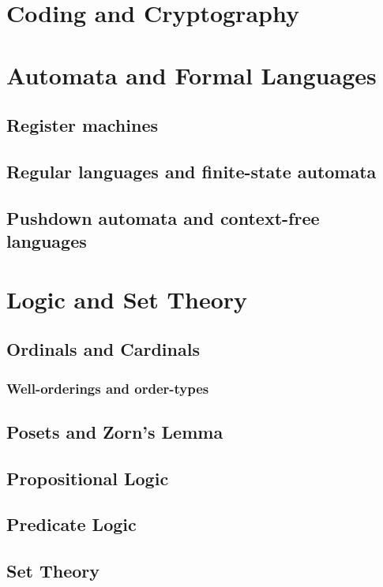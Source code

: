 \documentclass[12pt]{book}
\theoremstyle{definition}
\theoremstyle{remark}
\begin{document}
	
	\chapter{Coding and Cryptography}
	
	\chapter{Automata and Formal Languages}
		\section{Register machines}
		
		\section{Regular languages and finite-state automata}
		
		\section{Pushdown automata and context-free languages}
	\chapter{Logic and Set Theory}
		\section{Ordinals and Cardinals}
			\subsection{Well-orderings and order-types}
			
		\section{Posets and Zorn's Lemma}
		
		\section{Propositional Logic}
		
		\section{Predicate Logic}
		
		\section{Set Theory}
		
\end{document}
